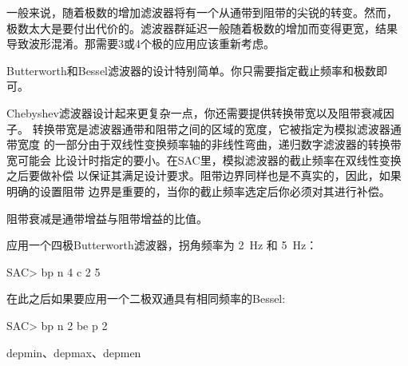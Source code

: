 一般来说，随着极数的增加滤波器将有一个从通带到阻带的尖锐的转变。然而，
极数太大是要付出代价的。滤波器群延迟一般随着极数的增加而变得更宽，结果
导致波形混淆。那需要3或4个极的应用应该重新考虑。

Butterworth和Bessel滤波器的设计特别简单。你只需要指定截止频率和极数即可。

Chebyshev滤波器设计起来更复杂一点，你还需要提供转换带宽以及阻带衰减因子。
转换带宽是滤波器通带和阻带之间的区域的宽度，它被指定为模拟滤波器通带宽度
的一部分由于双线性变换频率轴的非线性弯曲，递归数字滤波器的转换带宽可能会
比设计时指定的要小。在SAC里，模拟滤波器的截止频率在双线性变换之后要做补偿
以保证其满足设计要求。阻带边界同样也是不真实的，因此，如果明确的设置阻带
边界是重要的，当你的截止频率选定后你必须对其进行补偿。

阻带衰减是通带增益与阻带增益的比值。

应用一个四极Butterworth滤波器，拐角频率为 \SI{2}{\Hz} 和 \SI{5}{\Hz}：
\begin{SACCode}
SAC> bp n 4 c 2 5
\end{SACCode}

在此之后如果要应用一个二极双通具有相同频率的Bessel:
\begin{SACCode}
SAC> bp n 2 be p 2
\end{SACCode}

depmin、depmax、depmen
